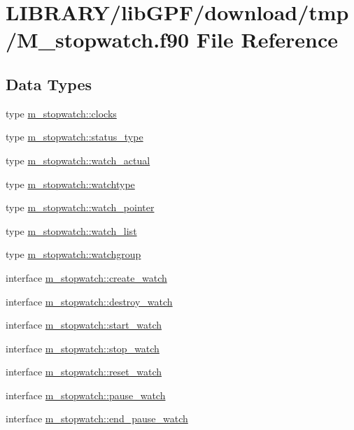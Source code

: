 \hypertarget{M__stopwatch_8f90}{}\section{L\+I\+B\+R\+A\+R\+Y/lib\+G\+P\+F/download/tmp/\+M\+\_\+stopwatch.f90 File Reference}
\label{M__stopwatch_8f90}
\subsection*{Data Types}
\begin{DoxyCompactItemize}
\item 
type \hyperlink{structm__stopwatch_1_1clocks}{m\+\_\+stopwatch\+::clocks}
\item 
type \hyperlink{structm__stopwatch_1_1status__type}{m\+\_\+stopwatch\+::status\+\_\+type}
\item 
type \hyperlink{structm__stopwatch_1_1watch__actual}{m\+\_\+stopwatch\+::watch\+\_\+actual}
\item 
type \hyperlink{structm__stopwatch_1_1watchtype}{m\+\_\+stopwatch\+::watchtype}
\item 
type \hyperlink{structm__stopwatch_1_1watch__pointer}{m\+\_\+stopwatch\+::watch\+\_\+pointer}
\item 
type \hyperlink{structm__stopwatch_1_1watch__list}{m\+\_\+stopwatch\+::watch\+\_\+list}
\item 
type \hyperlink{structm__stopwatch_1_1watchgroup}{m\+\_\+stopwatch\+::watchgroup}
\item 
interface \hyperlink{interfacem__stopwatch_1_1create__watch}{m\+\_\+stopwatch\+::create\+\_\+watch}
\item 
interface \hyperlink{interfacem__stopwatch_1_1destroy__watch}{m\+\_\+stopwatch\+::destroy\+\_\+watch}
\item 
interface \hyperlink{interfacem__stopwatch_1_1start__watch}{m\+\_\+stopwatch\+::start\+\_\+watch}
\item 
interface \hyperlink{interfacem__stopwatch_1_1stop__watch}{m\+\_\+stopwatch\+::stop\+\_\+watch}
\item 
interface \hyperlink{interfacem__stopwatch_1_1reset__watch}{m\+\_\+stopwatch\+::reset\+\_\+watch}
\item 
interface \hyperlink{interfacem__stopwatch_1_1pause__watch}{m\+\_\+stopwatch\+::pause\+\_\+watch}
\item 
interface \hyperlink{interfacem__stopwatch_1_1end__pause__watch}{m\+\_\+stopwatch\+::end\+\_\+pause\+\_\+watch}

\end{DoxyCompactItemize}

